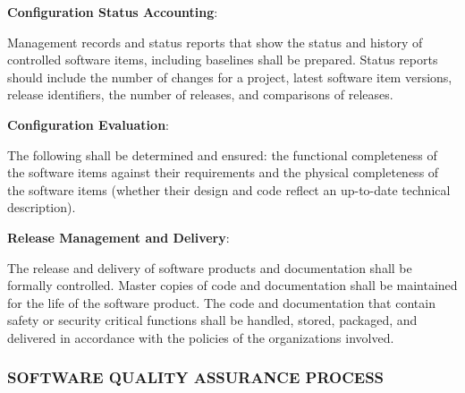 \begin{adjustwidth}{2em}{0pt}
\begin{compactenum}
\begin{compactenum}
					\end{compactenum}

					\item {\bf Configuration Status Accounting}:

					\begin{compactenum}

						\item Management records and status reports that show the status and history of controlled software items, including baselines shall be prepared. Status reports should include the number of changes for a project, latest software item versions, release identifiers, the number of releases, and comparisons of releases.

					\end{compactenum}

					\item {\bf Configuration Evaluation}:

					\begin{compactenum}

						\item The following shall be determined and ensured: the functional completeness of the software items against their requirements and the physical completeness of the software items (whether their design and code reflect an up-to-date technical description).

					\end{compactenum}

					\item {\bf Release Management and Delivery}:

					\begin{compactenum}

						\item The release and delivery of software products and documentation shall be formally controlled. Master copies of code and documentation shall be maintained for the life of the software product. The code and documentation that contain safety or security critical functions shall be handled, stored, packaged, and delivered in accordance with the policies of the organizations involved.

					\end{compactenum}

				\end{compactenum}

			\end{adjustwidth}

		\newpage
		\subsubsection{SOFTWARE QUALITY ASSURANCE PROCESS\label{proc:software_quality_assurance_process}}

